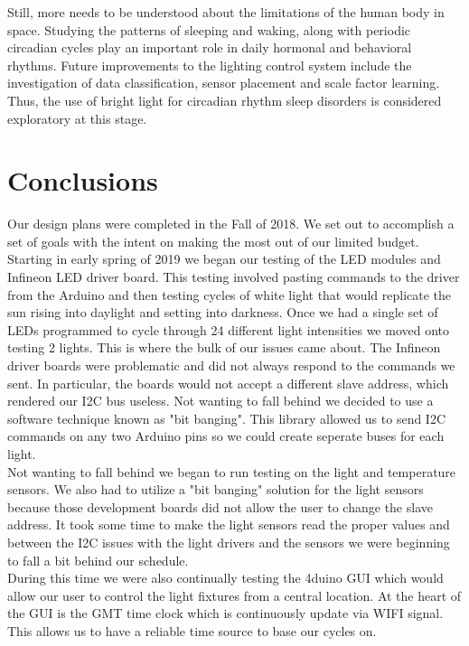 \documentclass[12pt,a4paper]{report}
\begin{document}
Still, more needs to be understood about the limitations of the human body in space. Studying the patterns of sleeping and waking, along with periodic circadian cycles play an important role in daily hormonal and behavioral rhythms. Future improvements to the lighting control system include the investigation of data classification, sensor placement and scale factor learning. Thus, the use of bright light for circadian rhythm sleep disorders is considered exploratory at this stage. 

\section{Conclusions}
Our design plans were completed in the Fall of 2018. We set out to accomplish a set of goals with the intent on making the most out of our limited budget. Starting in early spring of 2019 we began our testing of the LED modules and Infineon LED driver board. This testing involved pasting commands to the driver from the Arduino and then testing cycles of white light that would replicate the sun rising into daylight and setting into darkness. Once we had a single set of LEDs programmed to cycle through 24 different light intensities we moved onto testing 2 lights. This is where the bulk of our issues came about. The Infineon driver boards were problematic and did not always respond to the commands we sent. In particular, the boards would not accept a different slave address, which rendered our I2C bus useless. Not wanting to fall behind we decided to use a software technique known as "bit banging". This library allowed us to send I2C commands on any two Arduino pins so we could create seperate buses for each light.\\ 
Not wanting to fall behind we began to run testing on the light and temperature sensors. We also had to utilize a "bit banging" solution for the light sensors because those development boards did not allow the user to change the slave address. It took some time to make the light sensors read the proper values and between the I2C issues with the light drivers and the sensors we were beginning to fall a bit behind our schedule.\\ 
During this time we were also continually testing the 4duino GUI which would allow our user to control the light fixtures from a central location. At the heart of the GUI is the GMT time clock which is continuously update via WIFI signal. This allows us to have a reliable time source to base our cycles on.\\
\end{document}
